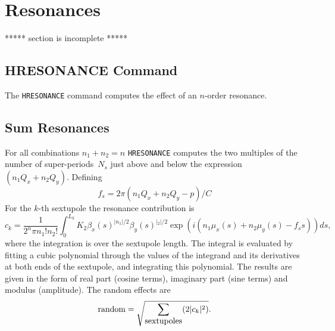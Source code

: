  
\section{Resonances}
***** section is incomplete *****
 
\subsection{HRESONANCE Command}
The {\tt HRESONANCE} command computes the effect of an $n$-order
resonance.
 
\subsection{Sum Resonances}
For all combinations $n_1 + n_2 = n$ {\tt HRESONANCE} computes the
two multiples of the number of super-periods~$N_s$ just above and
below the expression $(n_1 Q_x + n_2 Q_y)$.
Defining
\begin{equation}
f_s = 2\pi (n_1 Q_x + n_2 Q_y - p) / C
\end{equation}
For the $k$-th sextupole the resonance contribution is
\begin{equation}
c_k = \frac{1}{2^n \pi n_1! n_2!}
  \int_0^{L_k} K_2 \beta_x(s)^{|n_1|/2} \beta_y(s)^{|_2|/2}
  \exp(i(n_1 \mu_x(s) + n_2 \mu_y(s) - f_s s)) ds,
\end{equation}
where the integration is over the sextupole length.
The integral is evaluated by fitting a cubic polynomial through the
values of the integrand and its derivatives at both ends of the
sextupole, and integrating this polynomial.
The results are given in the form of real part (cosine terms),
imaginary part (sine terms) and modulus (amplitude).
The random effects are
\begin{equation}
\hbox{random} = \sqrt{\sum_{\hbox{sextupoles}} (2 |c_k|^2)}.
\end{equation}
 
\iffalse
     +       7X,'dE(s)',7X,'dE(r)',7X,'dQ(s)',7X,'dQ(r)',5X,
     +       'dQ20(s)',5X,'dQ20(r)')
      data beat
     +  / 1.0d0,      1.0d0,      2.0d0, 1.553774d0, 1.384812d0 /
      data fact
     +  / 1.0d0, 5.545455d0, 2.066667d0, 1.446735d0, 1.194130d0 /
 
          fact2 = (N_1**2 / ex0 + N_2**2 / ey0) *
     +            (sqrt(ex0)**n1 * sqrt(ey0)**n2)
          fact3 = 1.0
          if (norder .gt. 2  .and.  norder .lt. 6) then
            fact2 = fact2 * beat(norder)**(norder-2)
            fact3 = fact(norder)
          endif
          des = summ * fact2
          der = rsum * fact2
          dqs = des / sqrt(N_1**2+N_2**2)
          dqr = der / sqrt(N_1**2+N_2**2)
          dqs20 = dqs * fact3
          dqr20 = dqr * fact3
          write (iqpr2, 950) sum, summ, rsum,
     +                       des, der, dqs, dqr, dqs20, dqr20
\fi
 
